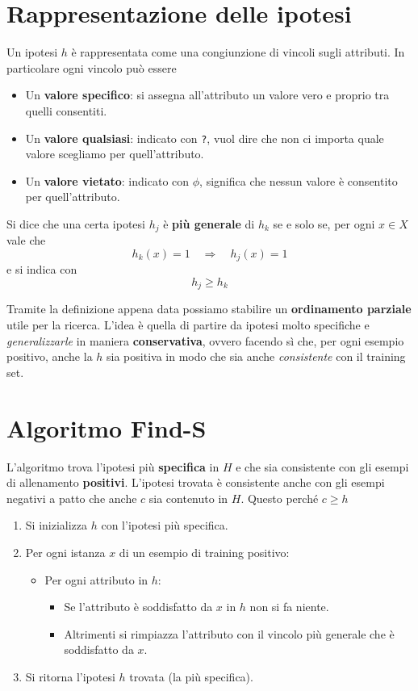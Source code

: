 \section{Rappresentazione delle ipotesi}
Un ipotesi $h$ \`e rappresentata come una congiunzione di vincoli sugli attributi. In particolare ogni vincolo pu\`o
essere
\begin{itemize}
	\item Un \textbf{valore specifico}: si assegna all'attributo un valore vero e proprio tra quelli consentiti.
	\item Un \textbf{valore qualsiasi}: indicato con \verb|?|, vuol dire che non ci importa quale valore
	      scegliamo per quell'attributo.
	\item Un \textbf{valore vietato}: indicato con $\phi$, significa che nessun valore \`e consentito per
	      quell'attributo.
\end{itemize}

\begin{definition}
	Si dice che una certa ipotesi $h_j$ \`e \textbf{pi\`u generale} di $h_k$ se e solo se, per ogni $x \in X$ vale che
	\[ h_k(x) = 1 \quad \Rightarrow \quad h_j(x) = 1 \]
	e si indica con
	\[ h_j \geq h_k \]
\end{definition}

Tramite la definizione appena data possiamo stabilire un \textbf{ordinamento parziale} utile per la ricerca.
L'idea \`e quella di partire da ipotesi molto specifiche e \emph{generalizzarle} in maniera \textbf{conservativa},
ovvero facendo s\`i che, per ogni esempio positivo, anche la $h$ sia positiva in modo che sia anche \emph{consistente}
con il training set.

\section{Algoritmo Find-S}
L'algoritmo trova l'ipotesi pi\`u \textbf{specifica} in $H$ e che sia consistente con gli esempi di allenamento
\textbf{positivi}. L'ipotesi trovata \`e consistente anche con gli esempi negativi a patto che anche $c$ sia
contenuto in $H$. Questo perch\'e $c \geq h$
\begin{enumerate}
	\item Si inizializza $h$ con l'ipotesi pi\`u specifica.
	\item Per ogni istanza $x$ di un esempio di training positivo:
	      \begin{itemize}
		      \item Per ogni attributo in $h$:
		            \begin{itemize}
			            \item Se l'attributo \`e soddisfatto da $x$ in $h$ non si fa niente.
			            \item Altrimenti si rimpiazza l'attributo con il vincolo pi\`u generale che \`e soddisfatto
			                  da $x$.
		            \end{itemize}
	      \end{itemize}
	\item Si ritorna l'ipotesi $h$ trovata (la pi\`u specifica).
\end{enumerate}

